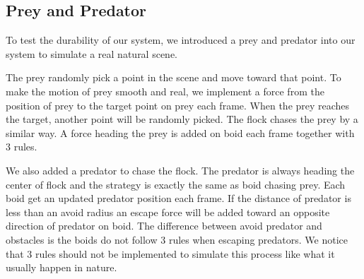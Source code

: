 \subsection{Prey and Predator}

To test the durability of our system, we introduced a prey and predator into our system to simulate a real natural scene.

The prey randomly pick a point in the scene and move toward that point. To make the motion of prey smooth and real, we implement a force from the position of prey to the target point on prey each frame. When the prey reaches the target, another point will be randomly picked. The flock chases the prey by a similar way. A force heading the prey is added on boid each frame together with 3 rules. 

We also added a predator to chase the flock. The predator is always heading the center of flock and the strategy is exactly the same as boid chasing prey. Each boid get an updated predator position each frame. If the distance of predator is less than an avoid radius an escape force will be added toward an opposite direction of predator on boid. The difference between avoid predator and obstacles is the boids do not follow 3 rules when escaping predators. We notice that 3 rules should not be implemented to simulate this process like what it usually happen in nature.
